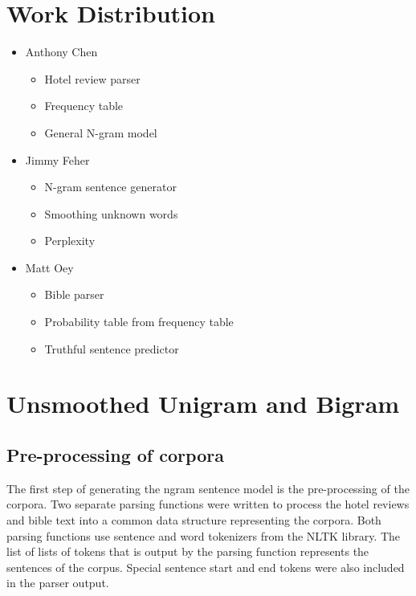 \documentclass[11pt]{article}
\begin{document}
\lstset{language=Python}
\setlength{\parindent}{0in}
\addtolength{\parskip}{0.1cm}
\setlength{\fboxrule}{.5mm}\setlength{\fboxsep}{1.2mm}
\newlength{\boxlength}\setlength{\boxlength}{\textwidth}
\addtolength{\boxlength}{-4mm}

\begin{center}
\end{center}

\section{Work Distribution}

\begin{itemize}
    \item Anthony Chen 
        \begin{itemize}
            \item Hotel review parser
            \item Frequency table
            \item General N-gram model
        \end{itemize}    
    \item Jimmy Feher
        \begin{itemize}
            \item N-gram sentence generator
            \item Smoothing unknown words
            \item Perplexity
        \end{itemize}  
    \item Matt Oey
        \begin{itemize}
            \item Bible parser
            \item Probability table from frequency table
            \item Truthful sentence predictor
        \end{itemize}  
\end{itemize}

\section{Unsmoothed Unigram and Bigram}
\subsection{Pre-processing of corpora}
The first step of generating the ngram sentence model is the pre-processing of the corpora. Two separate parsing functions were written to process the hotel reviews and bible text into a common data structure representing the corpora. Both parsing functions use sentence and word tokenizers from the NLTK library. The list of lists of tokens that is output by the parsing function represents the sentences of the corpus. Special sentence start and end tokens were also included in the parser output.
\end{document}
